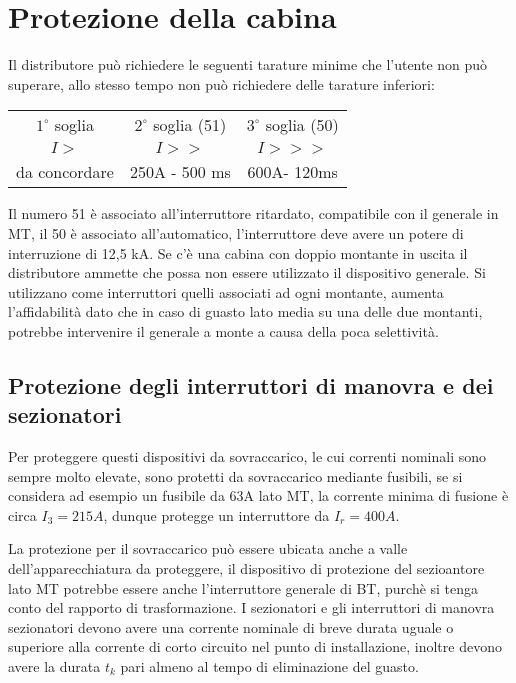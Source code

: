 \chapter{Protezione della cabina}
Il distributore può richiedere le seguenti tarature minime che l'utente non può superare, allo stesso tempo non può richiedere delle tarature inferiori:
\begin{table}[h]\centering
    \begin{tabular}{| c | c | c |}\hline
        $1^\circ$ soglia& $2^\circ$ soglia (51) & $3^\circ$ soglia (50) \\
        $I>$ & $I>>$ & $I>>>$\\ \hline
        da concordare &250A - 500 ms & 600A- 120ms \\ \hline
    \end{tabular}
\end{table}

Il numero 51 è associato all'interruttore ritardato, compatibile con il generale in MT, il 50 è associato all'automatico, l'interruttore deve avere un potere di interruzione di 12,5 kA. Se c'è una cabina con doppio montante in uscita il distributore ammette che possa non essere utilizzato il dispositivo generale. Si utilizzano come interruttori quelli associati ad ogni montante, aumenta l'affidabilità dato che in caso di guasto lato media su una delle due montanti, potrebbe intervenire il generale a monte a causa della poca selettività.

\section{Protezione degli interruttori di manovra e dei sezionatori}
Per proteggere questi dispositivi da sovraccarico, le cui correnti nominali sono sempre molto elevate, sono protetti da sovraccarico mediante fusibili, se si considera ad esempio un fusibile da 63A lato MT, la corrente minima di fusione è circa $I_3 = 215A$, dunque protegge un interruttore da $I_r = 400A$.

La protezione per il sovraccarico può essere ubicata anche a valle dell'apparecchiatura da proteggere, il dispositivo di protezione del sezioantore lato MT potrebbe essere anche l'interruttore generale di BT, purchè si tenga conto del rapporto di trasformazione. I sezionatori e gli interruttori di manovra sezionatori devono avere una corrente nominale di breve durata uguale o superiore alla corrente di corto circuito nel punto di installazione, inoltre devono avere la durata $t_k$ pari almeno al tempo di eliminazione del guasto.

